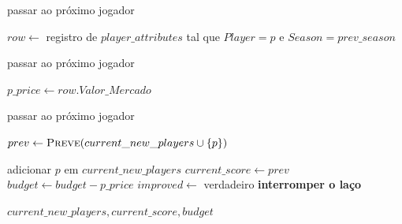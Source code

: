 \begin{breakablealgorithm}
\begin{algorithmic}[1]
            \State passar ao próximo jogador
        \EndIf

        \State $row \gets$ registro de $player\_attributes$ tal que $Player = p$ e $Season = prev\_season$

            \State passar ao próximo jogador
        \EndIf

        \State $p\_price \gets row.Valor\_Mercado$

            \State passar ao próximo jogador
        \EndIf

        \State $prev \gets \textsc{Preve}(current\_new\_players \cup \{p\})$

            \State adicionar $p$ em $current\_new\_players$
            \State $current\_score \gets prev$
            \State $budget \gets budget - p\_price$
            \State $improved \gets$ verdadeiro
            \State \textbf{interromper o laço}
        \EndIf

    \EndFor
\EndFor

\State \Return $current\_new\_players, current\_score, budget$

\EndFunction

\end{algorithmic}
\end{breakablealgorithm}